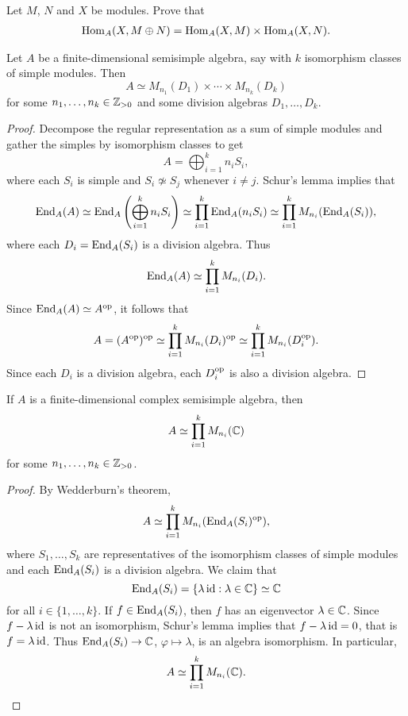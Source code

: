 \begin{exercise}
    Let $M$, $N$ and $X$ be modules. Prove that 
    \begin{align}
        \operatorname{Hom}_A(X,M\oplus N)=\operatorname{Hom}_A(X,M)\times\operatorname{Hom}_A(X,N).
    \end{align}
\end{exercise}

\begin{theorem}
Let $A$ be a finite-dimensional semisimple algebra, say with  
$k$ isomorphism classes of simple modules. Then 
\[
A\simeq M_{n_1}(D_1)\times\cdots\times M_{n_k}(D_k)
\]
for some $n_1,\dots,n_k\in\mathbb{Z}_{>0}$ and some division algebras $D_1,\dots,D_k$.
\end{theorem}

\begin{proof}
    Decompose the regular representation as a sum of simple modules and
    gather the simples by isomorphism classes to get 	
    \[
	A=\bigoplus_{i=1}^k n_iS_i,
	\]
	where each $S_i$ is simple and $S_i\not\simeq S_j$ whenever 
	$i\ne j$. Schur's lemma implies that  
	\begin{align*}
		\operatorname{End}_A(A)\simeq\operatorname{End}_A\left(\bigoplus_{i=1}^kn_iS_i\right)
		\simeq \prod_{i=1}^k\operatorname{End}_A(n_iS_i)
		\simeq\prod_{i=1}^kM_{n_i}(\operatorname{End}_A(S_i)), 
	\end{align*}
	where each $D_i=\operatorname{End}_A(S_i)$ is a division algebra. 
    Thus
    \[
		\operatorname{End}_A(A)\simeq\prod_{i=1}^kM_{n_i}(D_i).
	\]
	Since $\operatorname{End}_A(A)\simeq
	A^{\operatorname{op}}$, it follows that  
	\begin{align*}
		A=(A^{\operatorname{op}})^{\operatorname{op}}\simeq \prod_{i=1}^kM_{n_i}(D_i)^{\operatorname{op}}\simeq \prod_{i=1}^kM_{n_i}(D_i^{\operatorname{op}}).
	\end{align*}
	Since each $D_i$ is a division algebra, each $D_i^{\operatorname{op}}$ is also a division algebra.
\end{proof}

\begin{corollary}[Mollien]
	If $A$ is a finite-dimensional complex semisimple algebra, then 
	\[
	A\simeq\prod_{i=1}^k M_{n_i}(\mathbb{C})
	\]  
	for some $n_1,\dots,n_k\in\mathbb{Z}_{>0}$. 
\end{corollary}

\begin{proof}
	By Wedderburn's theorem,  
	\[
	A\simeq \prod_{i=1}^k M_{n_i}(\operatorname{End}_A(S_i)^{\operatorname{op}}),
	\]
	where $S_1,\dots,S_k$ are representatives of the isomorphism classes of simple modules
	and each $\operatorname{End}_A(S_i)$ is a division algebra. We claim that 
	\[
	\operatorname{End}_A(S_i)=\{\lambda\operatorname{id}:\lambda\in\mathbb{C}\}\simeq\mathbb{C}
	\]
	for all $i\in\{1,\dots,k\}$. If  
	$f\in\operatorname{End}_A(S_i)$, then $f$ has an eigenvector $\lambda\in\mathbb{C}$. Since  
	$f-\lambda\operatorname{id}$ is not an isomorphism, Schur's lemma implies that $f-\lambda\operatorname{id}=0$, 
	that is $f=\lambda\operatorname{id}$. Thus $\operatorname{End}_A(S_i)\to\mathbb{C}$, $\varphi\mapsto\lambda$, 
	is an algebra isomorphism. In particular,  
	\[
	A\simeq \prod_{i=1}^k M_{n_i}(\mathbb{C}).\qedhere
	\]
\end{proof}




